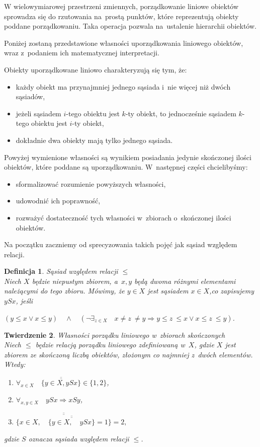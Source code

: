 \documentclass[12pt,a4paper]{report}
\newtheorem{theorem}{Twierdzenie}[section]
\newtheorem{definition}[theorem]{Definicja}
\newcommand{\licznosc}[1]{\overline{\overline{#1}}}
\begin{document}
W wielowymiarowej przestrzeni zmiennych, porządkowanie liniowe obiektów sprowadza się do rzutowania na~prostą punktów, które reprezentują obiekty poddane porządkowaniu.  Taka operacja pozwala na~ustalenie hierarchii obiektów.

Poniżej zostaną przedstawione własności uporządkowania liniowego obiektów, wraz z~podaniem ich matematycznej interpretacji.

Obiekty uporządkowane liniowo charakteryzują się tym, że:
\begin{itemize}
\item każdy obiekt ma przynajmniej jednego sąsiada i~nie więcej niż dwóch sąsiadów,
\item jeżeli sąsiadem $i$-tego obiektu jest $k$-ty obiekt, to jednocześnie sąsiadem $k$-tego obiektu jest $i$-ty obiekt,
\item dokładnie dwa obiekty mają tylko jednego sąsiada.
\end{itemize}


Powyżej wymienione własności są wynikiem posiadania jedynie skończonej ilości obiektów, które poddane są uporządkowaniu. W~następnej części chcielibyśmy:
\begin{itemize}
\item sformalizować rozumienie powyższych własności,
\item udowodnić ich poprawność,
\item rozważyć dostateczność tych własności w~zbiorach o~skończonej ilości obiektów.
\end{itemize}


Na początku zaczniemy od sprecyzowania takich pojęć jak sąsiad względem relacji.

\begin{definition}{Sąsiad względem relacji $\leq$}\label{def-sasiada} \\
Niech  $X$ będzie niepustym zbiorem, a~$x, y$ będą dwoma różnymi elementami należącymi do tego zbioru. Mówimy, że $y \in X$ jest sąsiadem $x \in X$,co zapisujemy $ySx$, jeśli

$\left(y \leq x \lor x \leq y \right) \quad \land \quad  \left(\lnot \exists_{z \in X}  \quad x\neq z~\neq y \Rightarrow   y \leq z~\leq x \lor x \leq z~\leq y \right)$.
\end{definition}


\begin{theorem}{Własności porządku liniowego w~zbiorach skończonych}\\
Niech $\leq$ będzie relacją porządku liniowego zdefiniowaną w~$X$, gdzie $X$ jest zbiorem ze skończoną liczbą obiektów, złożonym co najmniej z~dwóch elementów. Wtedy:
\begin{enumerate}
\item $\forall_{x \in X} \quad \licznosc{\{y \in X, ySx\}} \in \{1,2\}$,
\item $\forall_{x, y \in X} \quad ySx \Rightarrow xSy $,
\item $\licznosc{\{x \in X, \quad \licznosc{\{y \in X, \quad ySx \}}=1\}}=2,$
\end{enumerate}
gdzie $S$ oznacza sąsiada względem relacji $\leq$.
\end{theorem}
\end{document}
